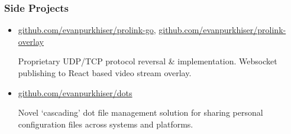 \documentclass[letterpaper,10pt]{article}
\begin{document}
\subsubsection{Side Projects}

\begin{itemize}
\item
  \href{https://github.com/evanpurkhiser/prolink-go}{github.com/evanpurkhiser/prolink-go},
  \href{https://github.com/evanpurkhiser/prolink-overlay}{github.com/evanpurkhiser/prolink-overlay}

  Proprietary UDP/TCP protocol reversal \& implementation. Websocket
  publishing to React based video stream overlay.
\item
  \href{https://github.com/evanpurkhiser/dots}{github.com/evanpurkhiser/dots}

  Novel `cascading' dot file management solution for sharing personal
  configuration files across systems and platforms.
\end{itemize}
\end{document}
